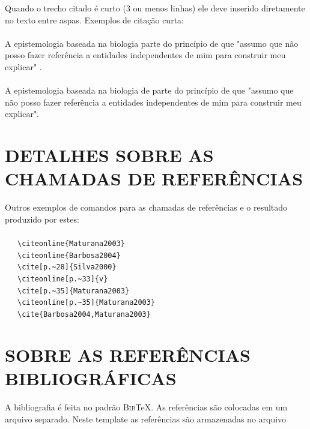 Quando o trecho citado é curto (3 ou menos linhas) ele deve inserido diretamente no texto entre aspas. Exemplos de citação curta:\\
\\A epistemologia baseada na biologia parte do princípio de que "assumo que não posso fazer referência a entidades independentes de mim para construir meu explicar" \cite[p.~35]{Maturana2003}.\\
\\A epistemologia baseada na biologia de  parte do princípio de que "assumo que não posso fazer referência a entidades independentes de mim para construir meu explicar".

\section{DETALHES SOBRE AS CHAMADAS DE REFERÊNCIAS}
\label{sec:referUtilizadas}

Outros exemplos de comandos para as chamadas de referências e o resultado produzido por estes:\\
\\ \ \ \  \verb|\citeonline{Maturana2003}|\\
 \ \ \   \verb|\citeonline{Barbosa2004}|\\
\cite[p.~28]{Silva2000} \ \ \  \verb|\cite[p.~28]{Silva2000}|\\
 \ \ \   \verb|\citeonline[p.~33]{v}|\\
\cite[p.~35]{Maturana2003} \ \ \   \verb|\cite[p.~35]{Maturana2003}|\\
 \ \ \   \verb|\citeonline[p.~35]{Maturana2003}|\\
\cite{Barbosa2004,Maturana2003} \ \ \   \verb|\cite{Barbosa2004,Maturana2003}|\\

\section{SOBRE AS REFERÊNCIAS BIBLIOGRÁFICAS}
\label{sec:apSobreRefer}

A bibliografia é feita no padrão \textsc{Bib}\TeX{}. As referências são colocadas em um arquivo separado. Neste template as referências são armazenadas no arquivo 


